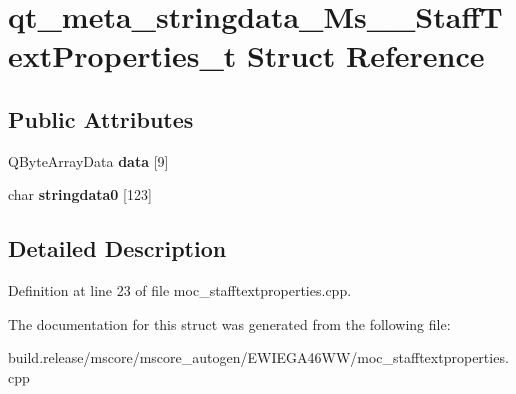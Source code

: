 \hypertarget{structqt__meta__stringdata___ms_____staff_text_properties__t}{}\section{qt\+\_\+meta\+\_\+stringdata\+\_\+\+Ms\+\_\+\+\_\+\+Staff\+Text\+Properties\+\_\+t Struct Reference}
\label{structqt__meta__stringdata___ms_____staff_text_properties__t}
\subsection*{Public Attributes}
\begin{DoxyCompactItemize}
\item 
\mbox{\label{structqt__meta__stringdata___ms_____staff_text_properties__t_a6bd17c484b6e578396826be8a8056fd2}} 
Q\+Byte\+Array\+Data {\bfseries data} \mbox{[}9\mbox{]}
\item 
\mbox{\label{structqt__meta__stringdata___ms_____staff_text_properties__t_a39f63a40eefb6b33b886828e471c8aa6}} 
char {\bfseries stringdata0} \mbox{[}123\mbox{]}
\end{DoxyCompactItemize}


\subsection{Detailed Description}


Definition at line 23 of file moc\+\_\+stafftextproperties.\+cpp.



The documentation for this struct was generated from the following file\+:\begin{DoxyCompactItemize}
\item 
build.\+release/mscore/mscore\+\_\+autogen/\+E\+W\+I\+E\+G\+A46\+W\+W/moc\+\_\+stafftextproperties.\+cpp\end{DoxyCompactItemize}
